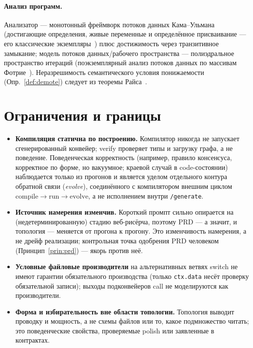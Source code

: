 \documentclass[11pt]{article}
\theoremstyle{plain}
\theoremstyle{definition}
\theoremstyle{remark}
\newcommand{\code}[1]{\texttt{#1}}
\newcommand{\state}[1]{\textsf{#1}}
\begin{document}
\paragraph{Анализ программ.} Анализатор --- монотонный фреймворк потоков данных
Кама--Ульмана~\cite{kamullman,kildall} (достигающие определения, живые переменные и
определённое присваивание --- его классические экземпляры~\cite{dragon,nielson}) плюс
достижимость через транзитивное замыкание; модель потоков данных/рабочего пространства ---
полиэдральное пространство итераций (поэкземплярный анализ потоков данных по массивам
Фотрие~\cite{feautrier}). Неразрешимость семантического условия понижаемости
(Опр.~\ref{def:demote}) следует из теоремы Райса~\cite{rice}.

\section{Ограничения и границы}\label{sec:limitations}

\begin{itemize}[nosep]
  \item \textbf{Компиляция статична по построению.} Компилятор никогда не запускает
        сгенерированный конвейер; \state{verify} проверяет типы и загрузку графа, а не
        поведение. Поведенческая корректность (например, правило консенсуса, корректное по
        форме, но вакуумное; краевой случай в code-состоянии) наблюдается только из
        прогонов и является уделом отдельного контура обратной связи (\emph{evolve}),
        соединённого с компилятором внешним циклом $\text{compile} \to \text{run} \to
        \text{evolve}$, а не исполнением внутри \code{/generate}.
  \item \textbf{Источник намерения изменчив.} Короткий промпт сильно опирается на
        (недетерминированную) стадию веб-рисёрча, поэтому PRD --- а значит, и топология ---
        меняется от прогона к прогону. Это изменчивость намерения, а не дрейф реализации;
        контрольная точка одобрения PRD человеком (Принцип~\ref{prin:prd}) --- якорь против
        неё.
  \item \textbf{Условные файловые производители} на альтернативных ветвях \state{switch}
        не имеют гарантии обязательного производства (только \code{ctx.data} несёт проверку
        обязательной записи); выходы подконвейеров \state{call} не моделируются как
        производители.
  \item \textbf{Форма и избирательность вне области топологии.} Топология выводит проводку
        и мощность, а не схемы файлов или то, какое подмножество читать; это поведенческие
        свойства, проверяемые \state{polish} или заявленные в контрактах.
\end{itemize}
\end{document}
